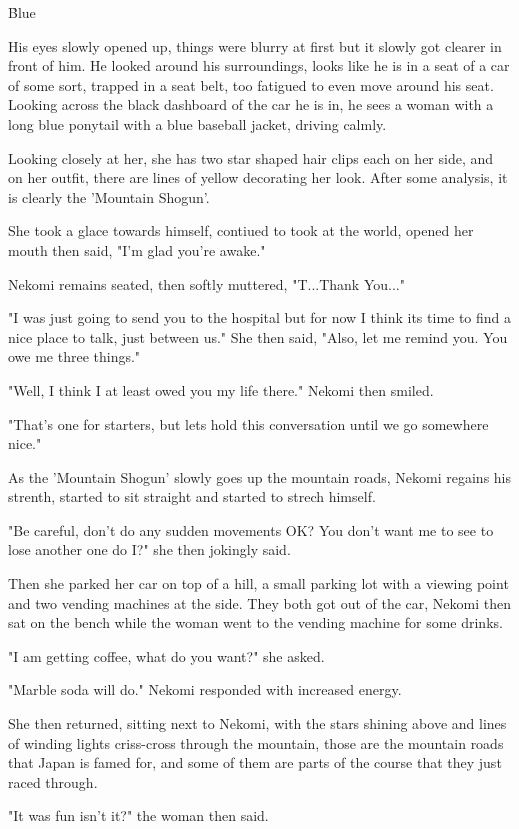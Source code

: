 \h{Blue}

His eyes slowly opened up, things were blurry at first but it slowly got clearer in front of him. He looked around his surroundings, looks like he is in a seat of a car of some sort, trapped in a seat belt, too fatigued to even move around his seat. Looking across the black dashboard of the car he is in, he sees a woman with a long blue ponytail with a blue baseball jacket, driving calmly.

Looking closely at her, she has two star shaped hair clips each on her side, and on her outfit, there are lines of yellow decorating her look. After some analysis, it is clearly the 'Mountain Shogun'.

She took a glace towards himself, contiued to took at the world, opened her mouth then said, "I'm glad you're awake."

Nekomi remains seated, then softly muttered, "T...Thank You..."

"I was just going to send you to the hospital but for now I think its time to find a nice place to talk, just between us." She then said, "Also, let me remind you. You owe me three things."

"Well, I think I at least owed you my life there." Nekomi then smiled.

"That's one for starters, but lets hold this conversation until we go somewhere nice."

As the 'Mountain Shogun' slowly goes up the mountain roads, Nekomi regains his strenth, started to sit straight and started to strech himself.

"Be careful, don't do any sudden movements OK? You don't want me to see to lose another one do I?" she then jokingly said.

Then she parked her car on top of a hill, a small parking lot with a viewing point and two vending machines at the side. They both got out of the car, Nekomi then sat on the bench while the woman went to the vending machine for some drinks.

"I am getting coffee, what do you want?" she asked.

"Marble soda will do." Nekomi responded with increased energy.

She then returned, sitting next to Nekomi, with the stars shining above and lines of winding lights criss-cross through the mountain, those are the mountain roads that Japan is famed for, and some of them are parts of the course that they just raced through.

"It was fun isn't it?" the woman then said.

